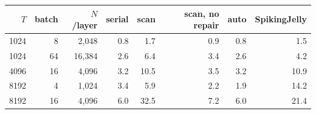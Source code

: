 \begin{tabular}{rrrrrrrr}
\toprule
$T$ & batch & $N$/layer & serial & scan & scan, no repair & auto & SpikingJelly\\
\midrule
1024 & 8 & 2{,}048 & 0.8 & 1.7 & 0.9 & 0.8 & 1.5\\
1024 & 64 & 16{,}384 & 2.6 & 6.4 & 3.4 & 2.6 & 4.2\\
4096 & 16 & 4{,}096 & 3.2 & 10.5 & 3.5 & 3.2 & 10.9\\
8192 & 4 & 1{,}024 & 3.4 & 5.9 & 2.2 & 1.9 & 14.2\\
8192 & 16 & 4{,}096 & 6.0 & 32.5 & 7.2 & 6.0 & 21.4\\
\bottomrule
\end{tabular}
